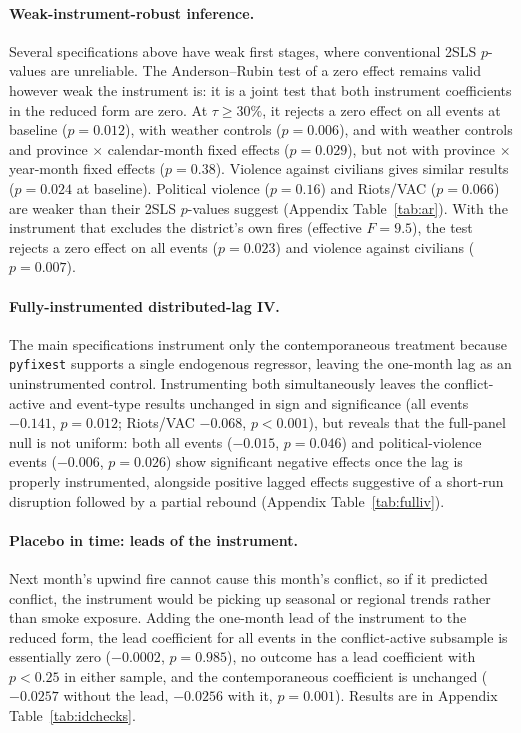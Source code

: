 \documentclass[12pt]{article}
\begin{document}
\paragraph{Weak-instrument-robust inference.} Several specifications above have weak first stages, where conventional 2SLS $p$-values are unreliable. The Anderson--Rubin test of a zero effect remains valid however weak the instrument is: it is a joint test that both instrument coefficients in the reduced form are zero. At $\tau \geq 30\%$, it rejects a zero effect on all events at baseline ($p=0.012$), with weather controls ($p=0.006$), and with weather controls and province $\times$ calendar-month fixed effects ($p=0.029$), but not with province $\times$ year-month fixed effects ($p=0.38$). Violence against civilians gives similar results ($p=0.024$ at baseline). Political violence ($p=0.16$) and Riots/VAC ($p=0.066$) are weaker than their 2SLS $p$-values suggest (Appendix Table~\ref{tab:ar}). With the instrument that excludes the district's own fires (effective $F = 9.5$), the test rejects a zero effect on all events ($p=0.023$) and violence against civilians ($p=0.007$).

\paragraph{Fully-instrumented distributed-lag IV.} The main specifications instrument only the contemporaneous treatment because \texttt{pyfixest} supports a single endogenous regressor, leaving the one-month lag as an uninstrumented control. Instrumenting both simultaneously leaves the conflict-active and event-type results unchanged in sign and significance (all events $-0.141$, $p=0.012$; Riots/VAC $-0.068$, $p<0.001$), but reveals that the full-panel null is not uniform: both all events ($-0.015$, $p=0.046$) and political-violence events ($-0.006$, $p=0.026$) show significant negative effects once the lag is properly instrumented, alongside positive lagged effects suggestive of a short-run disruption followed by a partial rebound (Appendix Table~\ref{tab:fulliv}).


\paragraph{Placebo in time: leads of the instrument.} Next month's upwind fire cannot cause this month's conflict, so if it predicted conflict, the instrument would be picking up seasonal or regional trends rather than smoke exposure. Adding the one-month lead of the instrument to the reduced form, the lead coefficient for all events in the conflict-active subsample is essentially zero ($-0.0002$, $p=0.985$), no outcome has a lead coefficient with $p<0.25$ in either sample, and the contemporaneous coefficient is unchanged ($-0.0257$ without the lead, $-0.0256$ with it, $p=0.001$). Results are in Appendix Table~\ref{tab:idchecks}.
\end{document}
